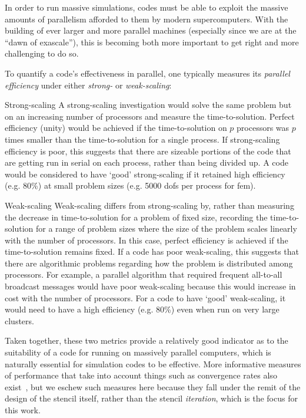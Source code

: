 In order to run massive simulations, codes must be able to exploit the massive amounts of parallelism afforded to them by modern supercomputers.
With the building of ever larger and more parallel machines (especially since we are at the ``dawn of exascale''), this is becoming both more important to get right and more challenging to do so.

To quantify a code's effectiveness in parallel, one typically measures its \textit{parallel efficiency} under either \textit{strong-} or \textit{weak-scaling}:

\begin{paragraph}{Strong-scaling}
A strong-scaling investigation would solve the same problem but on an increasing number of processors and measure the time-to-solution.
Perfect efficiency (unity) would be achieved if the time-to-solution on $p$ processors was $p$ times smaller than the time-to-solution for a single process.
If strong-scaling efficiency is poor, this suggests that there are sizeable portions of the code that are getting run in serial on each process, rather than being divided up.
A code would be considered to have `good' strong-scaling if it retained high efficiency (e.g. 80\%) at small problem sizes (e.g. 5000 \glspl{dof} per process for \gls{fem}).
\end{paragraph}

\begin{paragraph}{Weak-scaling}
Weak-scaling differs from strong-scaling by, rather than measuring the decrease in time-to-solution for a problem of fixed size, recording the time-to-solution for a range of problem sizes where the size of the problem scales linearly with the number of processors.
In this case, perfect efficiency is achieved if the time-to-solution remains fixed.
If a code has poor weak-scaling, this suggests that there are algorithmic problems regarding how the problem is distributed among processors.
For example, a parallel algorithm that required frequent all-to-all broadcast messages would have poor weak-scaling because this would increase in cost with the number of processors.
For a code to have `good' weak-scaling, it would need to have a high efficiency (e.g. 80\%) even when run on very large clusters.
\end{paragraph}

\vspace{1em}

Taken together, these two metrics provide a relatively good indicator as to the suitability of a code for running on massively parallel computers, which is naturally essential for simulation codes to be effective.
More informative measures of performance that take into account things such as convergence rates also exist~\cite{changComparativeStudyFinite2018}, but we eschew such measures here because they fall under the remit of the design of the stencil itself, rather than the stencil \textit{iteration}, which is the focus for this work.

